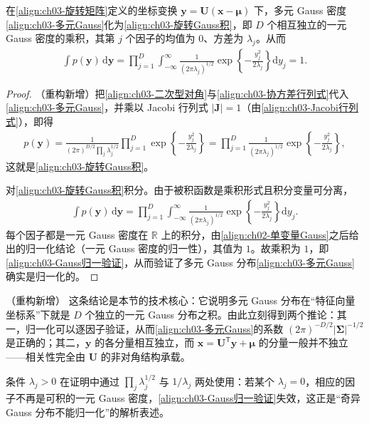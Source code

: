 \documentclass[../../main.tex]{subfiles}
\begin{document}
\begin{proposition}\label{proposition:ch03-旋转Gauss}
在\eqref{align:ch03-旋转矩阵}定义的坐标变换 $\boldsymbol{y}=\boldsymbol{U}(\boldsymbol{x}-\boldsymbol{\mu})$ 下，多元 Gauss 密度\eqref{align:ch03-多元Gauss}化为\eqref{align:ch03-旋转Gauss积}，即 $D$ 个相互独立的一元 Gauss 密度的乘积，其第 $j$ 个因子的均值为 $0$、方差为 $\lambda_j$。从而
\begin{align}
\int p(\boldsymbol{y})\,\mathrm{d}\boldsymbol{y}=\prod_{j=1}^{D}\int_{-\infty}^{\infty}\frac{1}{(2\pi\lambda_{j})^{1/2}}\exp\left\{-\frac{y_{j}^{2}}{2\lambda_{j}}\right\}\mathrm{d}y_{j}=1.
\label{align:ch03-Gauss归一验证}
\end{align}
\end{proposition}
\begin{proof}
（重构新增）把\eqref{align:ch03-二次型对角}与\eqref{align:ch03-协方差行列式}代入\eqref{align:ch03-多元Gauss}，并乘以 Jacobi 行列式 $\lvert\boldsymbol{J}\rvert=1$（由\eqref{align:ch03-Jacobi行列式}），即得
\begin{align*}
p(\boldsymbol{y})=\frac{1}{(2\pi)^{D/2}\prod_j\lambda_j^{1/2}}\prod_{j=1}^{D}\exp\left\{-\frac{y_j^{2}}{2\lambda_j}\right\}=\prod_{j=1}^{D}\frac{1}{(2\pi\lambda_j)^{1/2}}\exp\left\{-\frac{y_j^{2}}{2\lambda_j}\right\},
\end{align*}
这就是\eqref{align:ch03-旋转Gauss积}。

对\eqref{align:ch03-旋转Gauss积}积分。由于被积函数是乘积形式且积分变量可分离，
\begin{align*}
\int p(\boldsymbol{y})\,\mathrm{d}\boldsymbol{y}=\prod_{j=1}^{D}\int_{-\infty}^{\infty}\frac{1}{(2\pi\lambda_j)^{1/2}}\exp\left\{-\frac{y_j^{2}}{2\lambda_j}\right\}\mathrm{d}y_j.
\end{align*}
每个因子都是一元 Gauss 密度在 $\mathbb{R}$ 上的积分，由\cref{align:ch02-单变量Gauss}之后给出的归一化结论（一元 Gauss 密度的归一性），其值为 $1$。故乘积为 $1$，即\eqref{align:ch03-Gauss归一验证}，从而验证了多元 Gauss 分布\eqref{align:ch03-多元Gauss}确实是归一化的。
\end{proof}

\begin{remark}（重构新增）
这条结论是本节的技术核心：它说明多元 Gauss 分布在“特征向量坐标系”下就是 $D$ 个独立的一元 Gauss 分布之积。由此立刻得到两个推论：其一，归一化可以逐因子验证，从而\eqref{align:ch03-多元Gauss}的系数 $(2\pi)^{-D/2}\lvert\boldsymbol{\Sigma}\rvert^{-1/2}$ 是正确的；其二，$\boldsymbol{y}$ 的各分量相互独立，而 $\boldsymbol{x}=\boldsymbol{U}^{\mathsf{T}}\boldsymbol{y}+\boldsymbol{\mu}$ 的分量一般并不独立——相关性完全由 $\boldsymbol{U}$ 的非对角结构承载。

条件 $\lambda_j>0$ 在证明中通过 $\prod_j\lambda_j^{1/2}$ 与 $1/\lambda_j$ 两处使用：若某个 $\lambda_j=0$，相应的因子不再是可积的一元 Gauss 密度，\eqref{align:ch03-Gauss归一验证}失效，这正是“奇异 Gauss 分布不能归一化”的解析表述。
\end{remark}
\end{document}
